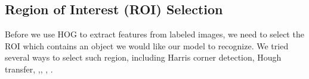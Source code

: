 \documentclass{article}
\begin{document}
\subsection{Region of Interest (ROI) Selection}
Before we use HOG to extract features from labeled images, we need to select the ROI which contains an object we would like our model to recognize. We tried several ways to select such region, including Harris corner detection, Hough transfer, \cite{brown2005multi},\cite{cirDetect1}, \cite{cirDetect2}, \cite{cirDetect3}.\\
\end{document}
